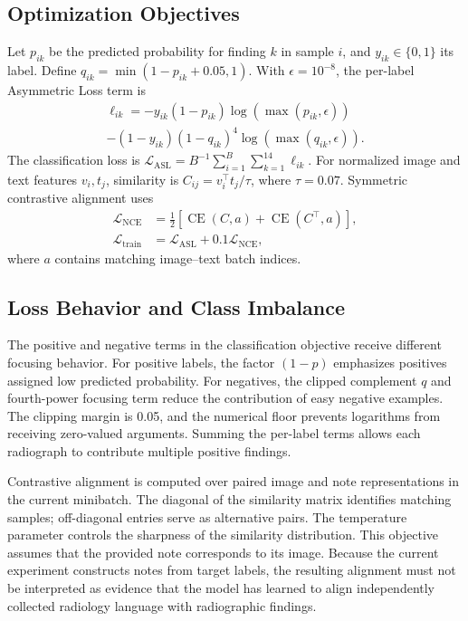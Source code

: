 \documentclass[conference,letterpaper]{IEEEtran}
\begin{document}
\subsection{Optimization Objectives}
Let $p_{ik}$ be the predicted probability for finding $k$ in sample $i$, and $y_{ik}\in\{0,1\}$ its label. Define $q_{ik}=\min(1-p_{ik}+0.05,1)$. With $\epsilon=10^{-8}$, the per-label Asymmetric Loss term is
\begin{multline}
\ell_{ik}=-y_{ik}(1-p_{ik})\log(\max(p_{ik},\epsilon))\\
-(1-y_{ik})(1-q_{ik})^4\log(\max(q_{ik},\epsilon)).
\end{multline}
The classification loss is $\mathcal{L}_{\mathrm{ASL}}=B^{-1}\sum_{i=1}^{B}\sum_{k=1}^{14}\ell_{ik}$. For normalized image and text features $v_i,t_j$, similarity is $C_{ij}=v_i^\top t_j/\tau$, where $\tau=0.07$. Symmetric contrastive alignment uses
\begin{align}
\mathcal{L}_{\mathrm{NCE}}&=\tfrac{1}{2}[\operatorname{CE}(C,a)+\operatorname{CE}(C^\top,a)],\\
\mathcal{L}_{\mathrm{train}}&=\mathcal{L}_{\mathrm{ASL}}+0.1\mathcal{L}_{\mathrm{NCE}},
\end{align}
where $a$ contains matching image--text batch indices.

\subsection{Loss Behavior and Class Imbalance}
The positive and negative terms in the classification objective receive different focusing behavior. For positive labels, the factor $(1-p)$ emphasizes positives assigned low predicted probability. For negatives, the clipped complement $q$ and fourth-power focusing term reduce the contribution of easy negative examples. The clipping margin is 0.05, and the numerical floor prevents logarithms from receiving zero-valued arguments. Summing the per-label terms allows each radiograph to contribute multiple positive findings.

Contrastive alignment is computed over paired image and note representations in the current minibatch. The diagonal of the similarity matrix identifies matching samples; off-diagonal entries serve as alternative pairs. The temperature parameter controls the sharpness of the similarity distribution. This objective assumes that the provided note corresponds to its image. Because the current experiment constructs notes from target labels, the resulting alignment must not be interpreted as evidence that the model has learned to align independently collected radiology language with radiographic findings.
\end{document}
